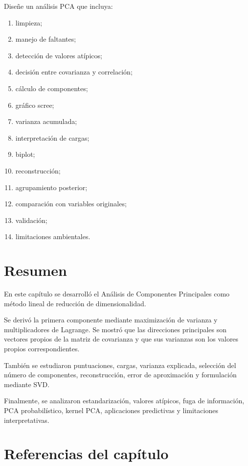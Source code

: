 \documentclass[
  spanish,
  10.5pt,
  letterpaper,
  DIV=11,
  numbers=noendperiod,
  oneside,
  open=any]{scrreprt}
\providecommand{\tightlist}{%
  \setlength{\itemsep}{0pt}\setlength{\parskip}{0pt}}
\theoremstyle{definition}
\theoremstyle{definition}
\theoremstyle{plain}
\theoremstyle{remark}
\begin{document}
Diseñe un análisis PCA que incluya:

\begin{enumerate}
\def\labelenumi{\arabic{enumi}.}
\tightlist
\item
  limpieza;
\item
  manejo de faltantes;
\item
  detección de valores atípicos;
\item
  decisión entre covarianza y correlación;
\item
  cálculo de componentes;
\item
  gráfico scree;
\item
  varianza acumulada;
\item
  interpretación de cargas;
\item
  biplot;
\item
  reconstrucción;
\item
  agrupamiento posterior;
\item
  comparación con variables originales;
\item
  validación;
\item
  limitaciones ambientales.
\end{enumerate}

\section*{Resumen}\label{resumen-15}


En este capítulo se desarrolló el Análisis de Componentes Principales
como método lineal de reducción de dimensionalidad.

Se derivó la primera componente mediante maximización de varianza y
multiplicadores de Lagrange. Se mostró que las direcciones principales
son vectores propios de la matriz de covarianza y que sus varianzas son
los valores propios correspondientes.

También se estudiaron puntuaciones, cargas, varianza explicada,
selección del número de componentes, reconstrucción, error de
aproximación y formulación mediante SVD.

Finalmente, se analizaron estandarización, valores atípicos, fuga de
información, PCA probabilístico, kernel PCA, aplicaciones predictivas y
limitaciones interpretativas.

\section*{Referencias del
capítulo}\label{referencias-del-capuxedtulo-16}
\end{document}
